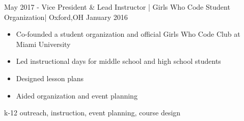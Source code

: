\begin{experiences}
  \experience
    {May 2017 - } {Vice President \& Lead Instructor | Girls Who Code Student Organization}{| Oxford,}{OH}
    {January 2016} {
                      \begin{itemize}
                        \item {Co-founded a student organization and official Girls Who Code Club at Miami University}
                        \item {Led instructional days for middle school and high school students}
                        \item {Designed lesson plans}
                        \item {Aided organization and event planning}
                      \end{itemize}
                    }
                    {k-12 outreach, instruction, event planning, course design}
\end{experiences}